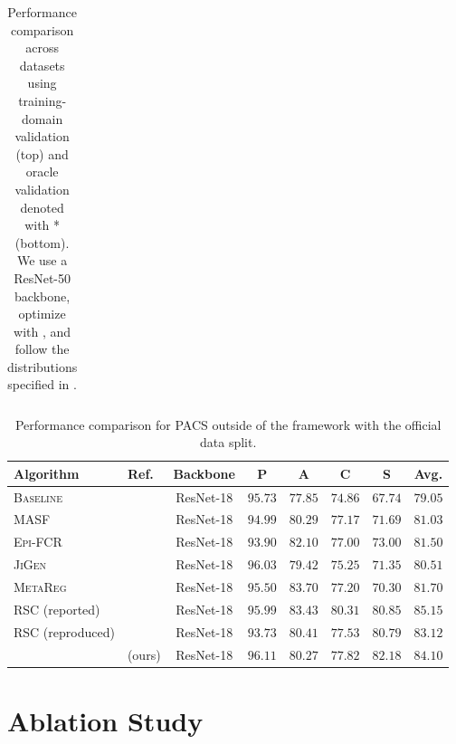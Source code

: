 \begin{table}[t]
\begin{tabular}{llcccccc}
\bottomrule
\end{tabular}
\caption[Performance comparison across datasets]{Performance comparison across datasets using training-domain validation (top) and  oracle validation denoted with * (bottom). We use a ResNet-50 backbone, optimize with \adam, and follow the distributions specified in \domainbed.}
    \label{tab:perfom}
\end{table}

\begin{table}
\small
\centering
\begin{tabular}{llcccccc}
\toprule
\textbf{Algorithm} & \textbf{Ref.} & \textbf{Backbone} & \textbf{P} & \textbf{A} & \textbf{C} & \textbf{S} &  \textbf{Avg.} \\
\midrule
\textsc{Baseline}		&\cite{CarlucciDBCT19}				&	ResNet-18	&	$95.73$		&	$77.85$		&	$74.86$		&	$67.74$		&	$79.05$		 \\
\textsc{MASF}		&\cite{DouCKG19}					&	ResNet-18	&	$94.99$		&	$80.29$		&	$77.17$		&	$71.69$		&	$81.03$		 \\
\textsc{Epi-FCR}		&\cite{LiZYLSH19}					&	ResNet-18	&	$93.90$		&	$82.10$		&	$77.00$		&	$73.00$		&	$81.50$		 \\
\textsc{JiGen}		&\cite{CarlucciDBCT19}				&	ResNet-18	&	$96.03$		&	$79.42$		&	$75.25$		&	$71.35$		&	$80.51$		\\
\textsc{MetaReg}		& \cite{BalajiSC18}					&	ResNet-18	&	$95.50$		&	$83.70$		&	$77.20$		&	$70.30$		&	$81.70$		\\
\textsc{RSC} (reported)	& \cite{huang2020selfchallenging}		&	ResNet-18	&	$95.99$		&	$83.43$		&	$80.31$		&	$80.85$		&	$85.15$		\\
\textsc{RSC} (reproduced) & \cite{huang2020selfchallenging}		&	ResNet-18	&	$93.73$		&	$80.41$		&	$77.53$		&	$80.79$		&	$83.12$		\\
\divcams			&     (ours)						&	ResNet-18	&	$96.11$		&	$80.27$		&	$77.82$		&	$82.18$		&	$84.10$		\\
\bottomrule
\end{tabular}
\caption[Performance comparison for official PACS splits outside of \domainbed]{Performance comparison for PACS outside of the \domainbed framework with the official data split.}
\end{table}



\section{Ablation Study}


